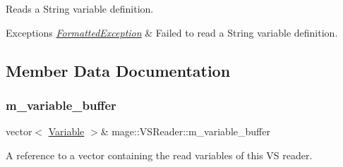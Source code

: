 Reads a String variable definition.


\begin{DoxyExceptions}{Exceptions}
{\em \hyperlink{structmage_1_1_formatted_exception}{Formatted\+Exception}} & Failed to read a String variable definition. \\
\hline
\end{DoxyExceptions}


\subsection{Member Data Documentation}
\hypertarget{classmage_1_1_v_s_reader_a535a576912adc3dadb1523280b5e5fc3}{}\label{classmage_1_1_v_s_reader_a535a576912adc3dadb1523280b5e5fc3} 
\subsubsection{\texorpdfstring{m\+\_\+variable\+\_\+buffer}{m\_variable\_buffer}}
{\footnotesize\ttfamily vector$<$ \hyperlink{structmage_1_1_variable}{Variable} $>$\& mage\+::\+V\+S\+Reader\+::m\+\_\+variable\+\_\+buffer\hspace{0.3cm}{\ttfamily [private]}}

A reference to a vector containing the read variables of this VS reader. 